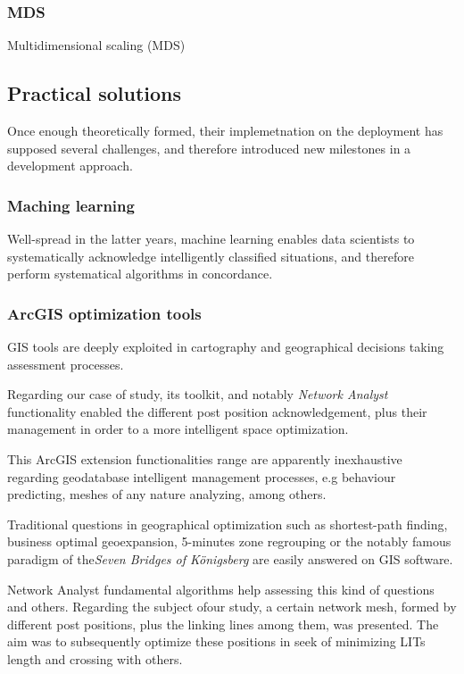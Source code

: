 \subsubsection{MDS}
\label{subsub:AIG:SLV:MDS}

Multidimensional scaling (MDS) 

\subsection{Practical solutions}

Once enough theoretically formed, their implemetnation on the  deployment has supposed several challenges, and therefore introduced new milestones in a development approach.

\subsubsection{Maching learning}
\label{sub:AIG:machine_learning}

Well-spread in the latter years, machine learning enables data scientists to systematically acknowledge intelligently classified situations, and therefore perform systematical algorithms in concordance.

\subsubsection{ArcGIS optimization tools}

GIS tools are deeply exploited in cartography and geographical decisions taking assessment processes. 

Regarding our case of study, its toolkit, and notably \textit{Network Analyst} functionality enabled the different post position acknowledgement, plus their management in order to a more intelligent space optimization.


This ArcGIS extension functionalities range are apparently inexhaustive regarding geodatabase intelligent management processes, e.g behaviour predicting, meshes of any nature analyzing, among others.

Traditional questions in geographical optimization such as shortest-path finding, business optimal geoexpansion, 5-minutes zone regrouping or the notably famous paradigm of the\textit{Seven Bridges of Königsberg} are easily answered on GIS software. 

Network Analyst fundamental algorithms help assessing this kind of questions and others. Regarding the subject ofour study, a certain network mesh, formed by different post positions, plus the linking lines among them, was presented. The aim was to subsequently optimize these positions in seek of minimizing LITs length and crossing with others. 

